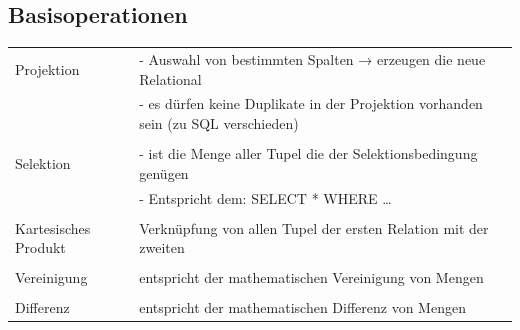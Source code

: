 \documentclass[a4paper]{article}
\begin{document}
\subsection{Basisoperationen}
\begin{tabular}{l p{11cm}}
    Projektion &  - Auswahl von bestimmten Spalten → erzeugen die neue Relational \\
     & - es dürfen keine Duplikate in der Projektion vorhanden sein (zu SQL verschieden) \\
     & \\
    Selektion & - ist die Menge aller Tupel die der Selektionsbedingung genügen \\
     & - Entspricht dem: SELECT * WHERE … \\
     & \\
    Kartesisches Produkt & Verknüpfung von allen Tupel der ersten Relation mit der zweiten\\
    & \\
    Vereinigung & entspricht der mathematischen Vereinigung von Mengen\\
    & \\
    Differenz & entspricht der mathematischen Differenz von Mengen
\end{tabular}
\end{document}

